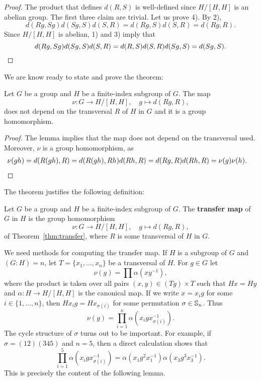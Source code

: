 \begin{proof}
	The product that defines $d(R,S)$ is well-defined since $H/[H,H]$ is 
	an abelian group. The first three claim are trivial. Let us prove
	4). By 2), 
	\[
		d(Rg,Sg)d(Sg,S)d(S,R)=d(Rg,S)d(S,R)=d(Rg,R).
	\]
	Since $H/[H,H]$ is abelian, 1) and 3) imply that 	
	\[
		d(Rg,Sg)d(Sg,S)d(S,R)=d(R,S)d(S,R)d(Sg,S)=d(Sg,S).\qedhere
	\]
\end{proof}

We are know ready to state and 
prove the theorem: 

\begin{theorem}
	\label{thm:transfer}
	Let $G$ be a group and $H$ be a finite-index subgroup of $G$. The map 	
	\[
		\nu\colon G\to H/[H,H],\quad
		g\mapsto d(Rg,R),
	\]
	does not depend on the transversal $R$ of $H$ in $G$ and it is a group
	homomorphism. 
\end{theorem}

\begin{proof}
	The lemma implies that the map does not depend on the transversal used. 
	Moreover, $\nu$ is a group homomorphism, as 
	\begin{align*}
		\nu(gh)&=d(R(gh),R)
		=d(R(gh),Rh)d(Rh,R)
		=d(Rg,R)d(Rh,R)=\nu(g)\nu(h).\qedhere
	\end{align*}
\end{proof}

The theorem justifies the following definition: 

\begin{definition}
	Let $G$ be a group and $H$ be a finite-index subgroup of $G$. The
	\textbf{transfer map} of $G$ in $H$ is the group homomorphism 
	\[
		\nu\colon G\to H/[H,H],
		\quad
		g\mapsto d(Rg,R),
	\]
	of Theorem~\ref{thm:transfer}, where $R$ is some transversal of $H$ in $G$.
\end{definition}

We need methods for computing the transfer map. If $H$ is a subgroup of 
$G$
and $(G:H)=n$, let $T=\{x_1,\dots,x_n\}$ be a transversal of $H$. For $g\in G$ let  
\[
	\nu(g)=\prod \alpha(xy^{-1}),
\]
where the product is taken over all pairs $(x,y)\in (Tg)\times T$ such that $Hx=Hy$
and $\alpha\colon H\to H/[H,H]$ is the canonical map. 
If we write 
$x=x_ig$ for some $i\in\{1,\dots,n\}$, then  
$Hx_ig=Hx_{\sigma(i)}$ for some permutation $\sigma\in\mathbb{S}_n$. Thus 
\[
	\nu(g)=\prod_{i=1}^n\alpha(x_igx_{\sigma(i)}^{-1}).
\]
The cycle structure of $\sigma$ turns out to be important. 
For example, if $\sigma=(12)(345)$ and $n=5$, then a direct calculation shows that 
\[
\prod_{i=1}^5\alpha\left(x_igx_{\sigma(i)}^{-1}\right)
=\alpha(x_1g^2x_1^{-1})\alpha(x_3g^3x_3^{-1}).
\]
This is precisely the content of the following lemma. 



